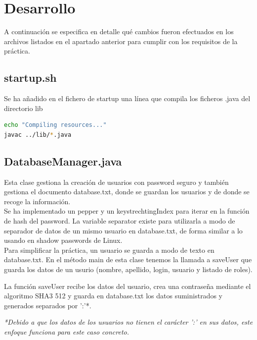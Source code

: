 \documentclass[10pt,a4paper]{article}
\begin{document}
\section*{Desarrollo}
A continuación se especifica en detalle qué cambios fueron efectuados en los archivos listados en el apartado anterior para cumplir con los requisitos de la práctica.

\subsection*{startup.sh}
Se ha añadido en el fichero de startup una línea que compila los ficheros .java del directorio lib
\begin{lstlisting}[language=bash]
echo "Compiling resources..."
javac ../lib/*.java
\end{lstlisting}

\subsection*{DatabaseManager.java}
Esta clase gestiona la creación de usuarios con password seguro y también gestiona el documento database.txt, donde se guardan los usuarios y de donde se recoge la información.\\


Se ha implementado un pepper y un keystrechtingIndex para iterar en la función de hash del password. La variable separator existe para utilizarla a modo de separador de datos de un mismo usuario en database.txt, de forma similar a lo usando en shadow passwords de Linux.\\

Para simplificar la práctica, un usuario se guarda a modo de texto en database.txt. En el método main de esta clase tenemos la llamada a saveUser que guarda los datos de un usurio (nombre, apellido, login, usuario y listado de roles).

La función saveUser recibe los datos del usuario, crea una contraseña mediante el algoritmo SHA3 512 y guarda en database.txt los datos suministrados y generados separados por ':'*.


\textit{*Debido a que los datos de los usuarios no tienen el carácter ':' en sus datos, este enfoque funciona para este caso concreto.}\\
\end{document}
